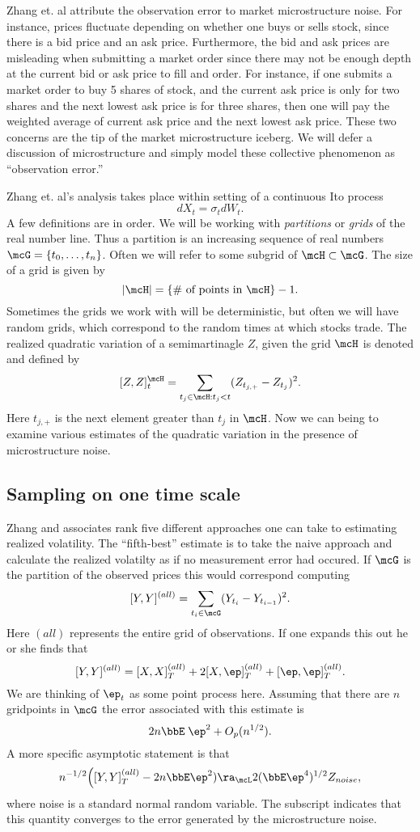 \documentclass{report}
\begin{document}
Zhang et. al attribute the observation error to market microstructure
noise.  For instance, prices fluctuate depending on whether one buys
or sells stock, since there is a bid price and an ask price. 
Furthermore, the bid and ask prices are misleading when submitting a
market order since there may not be enough depth at the current bid or
ask price to fill and order.  For instance, if one submits a market
order to buy 5 shares of stock, and the current ask price is only for
two shares and the next lowest ask price is for three shares, then one
will pay the weighted average of current ask price and the next lowest
ask price.  These two concerns are the tip of the market
microstructure iceberg.  We will defer a discussion of microstructure
and simply model these collective phenomenon as ``observation error.''

Zhang et. al's analysis takes place within setting of a continuous Ito
process
\[
dX_t = \sigma_t dW_t.
\]
A few definitions are in order.  We will be working with \emph{partitions} or \emph{grids} of the real number line.  Thus a partition is an increasing sequence of real numbers $\mcG = \{ t_0, \ldots, t_n \}$.  Often we will refer to some subgrid of $\mcH \subset \mcG$.  The size of a grid is given by 
\[
|\mcH| = \{ \textmd{\# of points in } \mcH \} - 1.
\]
Sometimes the grids we work with will be deterministic, but often we will have random grids, which correspond to the random times at which stocks trade.  The realized quadratic variation of a semimartinagle $Z$, given the grid $\mcH$ is denoted and defined by
\[
[Z,Z]^\mcH_t = \sum_{t_j \in \mcH : t_j < t} (Z_{t_{j,+}}-Z_{t_j})^2.
\]
Here $t_{j,+}$ is the next element greater than $t_j$ in $\mcH$.  Now we can being to examine various estimates of the quadratic variation in the presence of microstructure noise.

\subsection{Sampling on one time scale}

Zhang and associates rank five different approaches one can take to
estimating realized volatility.  The ``fifth-best'' estimate is to
take the naive approach and calculate the realized volatilty as if no measurement error had occured.  If $\mcG$ is the partition of the
observed prices this would correspond computing
\[
[Y,Y]^{(all)} = \sum_{t_i \in \mcG} (Y_{t_i} - Y_{t_{i-1}})^2.
\]
Here $(all)$ represents the entire grid of observations.  If one expands this out he or she finds that
\[
[Y,Y]^{(all)} = [X,X]_T^{(all)} + 2 [X,\ep]_T^{(all)} + [\ep,\ep]_T^{(all)}.
\]
We are thinking of $\ep_t$ as some point process here.
Assuming that there are $n$ gridpoints in $\mcG$ the error associated
with this estimate is
\[
2 n \bbE \; \ep^2 + O_p(n^{1/2}).
\]
A more specific asymptotic statement is that
\[
n^{-1/2} \Big( [Y,Y]^{(all)}_T - 2 n \bbE \ep^2 ) \ra_\mcL 2 (\bbE \ep^4)^{1/2} Z_{noise},
\]
where noise is a standard normal random variable.  The subscript indicates that this quantity converges to the error generated by the microstructure noise.
\end{document}

